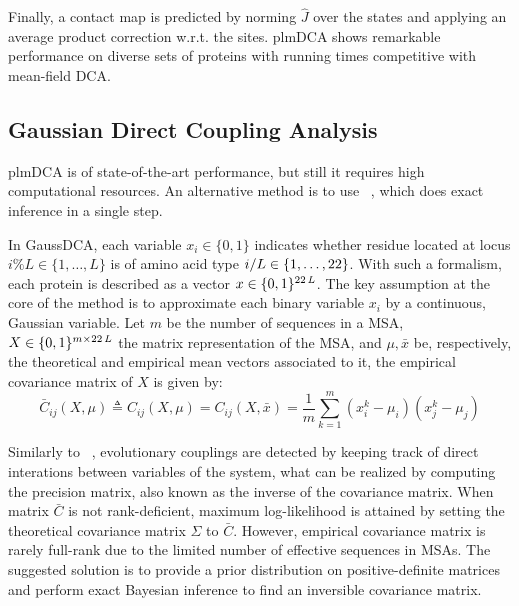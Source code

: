         Finally, a contact map is predicted by norming $\hat{J}$ over the states and applying an average product correction w.r.t. the sites.
        plmDCA shows remarkable performance on diverse sets of proteins with running times competitive with mean-field DCA.


    \subsection{Gaussian Direct Coupling Analysis}

        plmDCA is of state-of-the-art performance, but still it requires high computational resources.
        An alternative method is to use ~\cite{10.1371/journal.pone.0092721}, which does
        exact inference in a single step.

        In GaussDCA, each variable $x_i \in \{0, 1\}$ indicates whether residue located at locus $i \% L \in \{ 1, \dotsc, L \}$
        is of amino acid type $i / L \in \{1, \dotsc, 22\}$. With such a formalism, each protein is described as a vector
        $x \in \{0, 1\}^{22\,L}$. The key assumption at the core of the method is to approximate each binary variable $x_i$
        by a continuous, Gaussian variable. Let $m$ be the number of sequences in a MSA, $X \in \{0, 1\}^{m \times 22\,L}$
        the matrix representation of the MSA, and $\mu, \bar{x}$ be, respectively, the theoretical and empirical mean vectors associated to it,
        the empirical covariance matrix of $X$ is given by:
        \begin{equation}
            \bar{C}_{ij}(X, \mu) \triangleq C_{ij}(X, \mu) = C_{ij}(X, \bar{x}) = \frac{1}{m} \sum\limits_{k=1}^m (x_i^k - \mu_i) (x_j^k - \mu_j)
        \end{equation}

        Similarly to ~\cite{doi:10.1093/bioinformatics/btr638}, evolutionary couplings are detected by keeping track of direct interations
        between variables of the system, what can be realized by computing the precision matrix, also known as the inverse of the covariance matrix.
        When matrix $\bar{C}$ is not rank-deficient, maximum log-likelihood is attained by setting the theoretical covariance matrix
        $\Sigma$ to $\bar{C}$. However, empirical covariance matrix is rarely full-rank due to the limited number of effective sequences
        in MSAs. The suggested solution is to provide a prior distribution on positive-definite matrices and perform exact Bayesian inference
        to find an inversible covariance matrix.

